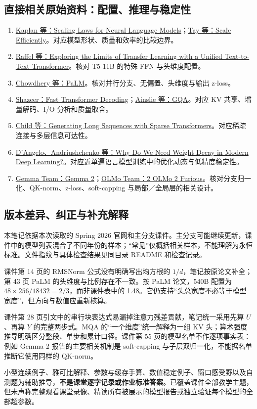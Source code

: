 \documentclass[UTF8,fontset=fandol,zihao=-4,a4paper]{ctexart}
\begin{document}
\subsection{直接相关原始资料：配置、推理与稳定性}
\begin{enumerate}[start=6]
\item \href{https://arxiv.org/abs/2001.08361}{Kaplan 等：Scaling Laws for Neural Language Models}；\href{https://arxiv.org/abs/2109.10686}{Tay 等：Scale Efficiently}。对应模型形状、质量和效率的比较边界。
\item \href{https://arxiv.org/abs/1910.10683}{Raffel 等：Exploring the Limits of Transfer Learning with a Unified Text-to-Text Transformer}。核对 T5-11B 的特殊 FFN 与头维度配置。
\item \href{https://arxiv.org/abs/2204.02311}{Chowdhery 等：PaLM}。核对并行分支、无偏置、头维度与输出 z-loss。
\item \href{https://arxiv.org/abs/1911.02150}{Shazeer：Fast Transformer Decoding}；\href{https://arxiv.org/abs/2305.13245}{Ainslie 等：GQA}。对应 KV 共享、增量解码、I/O 分析和质量取舍。
\item \href{https://arxiv.org/abs/1904.10509}{Child 等：Generating Long Sequences with Sparse Transformers}。对应稀疏连接与多层信息可达性。
\item \href{https://arxiv.org/abs/2310.04415}{D'Angelo、Andriushchenko 等：Why Do We Need Weight Decay in Modern Deep Learning?}。对应近单遍语言模型训练中的优化动态与低精度稳定性。
\item \href{https://arxiv.org/abs/2408.00118}{Gemma Team：Gemma 2}；\href{https://arxiv.org/abs/2501.00656}{OLMo Team：2 OLMo 2 Furious}。核对分支归一化、QK-norm、z-loss、soft-capping 与局部／全局层的相关设计。
\end{enumerate}

\subsection{版本差异、纠正与补充解释}
本笔记依据本次读取的 Spring 2026 官网和主分支课件。主分支可能继续更新，课件中的模型列表混合了不同年份的样本；“常见”仅概括相关样本，不能理解为永恒标准。文件指纹与具体检查结果见同目录 README 和检查记录。

课件第 14 页的 RMSNorm 公式没有明确写出均方根的 $1/d$，笔记按原论文补全；第 43 页 PaLM 的头维度与比例存在不一致。按 PaLM 论文，540B 配置为 $48\times256/18432=2/3$，而非课件表中的 1.48。它仍支持“头总宽度不必等于模型宽度”，但方向与数值应重新核算。

课件第 28 页引文中的串行块表达式易漏掉注意力残差贡献，笔记统一采用先算 $U$、再算 $Y$ 的完整两步式。MQA 的“一个维度”统一解释为一组 KV 头；算术强度推导明确区分整段、单步和累计口径。课件第 55 页的模型名单不作逐项事实表：例如 Gemma 2 报告的主要相关机制是 soft-capping 与子层双归一化，不能据名单推断它使用同样的 QK-norm。

小型连续例子、雅可比解释、参数与缓存手算、数值稳定例子、窗口感受野以及自测题为辅助推导，\textbf{不是课堂逐字记录或作业标准答案}。已覆盖课件全部教学主题，但未声称完整观看课堂录像、精读所有被展示的模型报告或独立验证每个模型的全部超参数。
\end{document}
